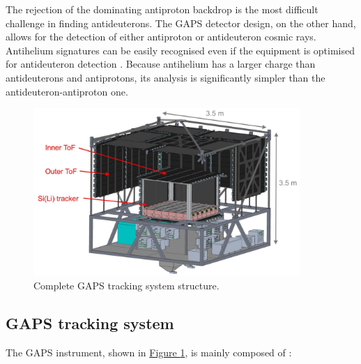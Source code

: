 \par
The rejection of the dominating antiproton backdrop is the most difficult challenge in finding antideuterons. The GAPS detector design, on the other hand, allows for the detection of either antiproton or antideuteron cosmic rays. Antihelium signatures can be easily recognised even if the equipment is optimised for antideuteron detection \cite{aramaki_2014_potential}. Because antihelium has a larger charge than antideuterons and antiprotons, its analysis is significantly simpler than the antideuteron-antiproton one.

\begin{figure}[ht]
    \centering
    \includegraphics[width=0.9\textwidth]{Images/appendGAPSintro/GAPS_tracker_structure.jpg}
    \caption{Complete GAPS tracking system structure.}
    \label{figGAPStrackerstructure}
\end{figure}


\subsection*{GAPS tracking system}
\label{gapsTrackingSystem}
The GAPS instrument, shown in \hyperref[figGAPStrackerstructure]{Figure \ref{figGAPStrackerstructure}}, is mainly composed of \cite{rogers_2019_largearea}:

